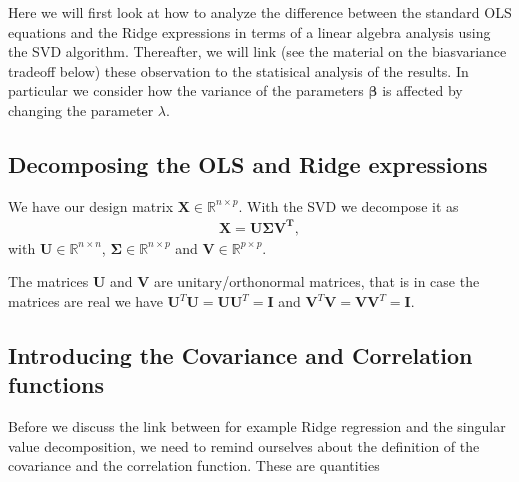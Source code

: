 \documentclass[letterpaper,10pt,english]{sphinxmanual}
\begin{document}
Here we will first look at how to analyze the difference between the
standard OLS equations and the Ridge expressions in terms of a linear
algebra analysis using the SVD algorithm. Thereafter, we will link
(see the material on the bias\sphinxhyphen{}variance tradeoff below) these
observation to the statisical analysis of the results. In particular
we consider how the variance of the parameters \(\boldsymbol{\beta}\) is
affected by changing the parameter \(\lambda\).


\subsection{Decomposing the OLS and Ridge expressions}
\label{\detokenize{chapter4:decomposing-the-ols-and-ridge-expressions}}
We have our design matrix
\(\boldsymbol{X}\in {\mathbb{R}}^{n\times p}\). With the SVD we decompose it as
\begin{equation*}
\begin{split}
\boldsymbol{X} = \boldsymbol{U\Sigma V^T},
\end{split}
\end{equation*}
with \(\boldsymbol{U}\in {\mathbb{R}}^{n\times n}\), \(\boldsymbol{\Sigma}\in {\mathbb{R}}^{n\times p}\)
and \(\boldsymbol{V}\in {\mathbb{R}}^{p\times p}\).

The matrices \(\boldsymbol{U}\) and \(\boldsymbol{V}\) are unitary/orthonormal matrices, that is in case the matrices are real we have \(\boldsymbol{U}^T\boldsymbol{U}=\boldsymbol{U}\boldsymbol{U}^T=\boldsymbol{I}\) and \(\boldsymbol{V}^T\boldsymbol{V}=\boldsymbol{V}\boldsymbol{V}^T=\boldsymbol{I}\).


\subsection{Introducing the Covariance and Correlation functions}
\label{\detokenize{chapter4:introducing-the-covariance-and-correlation-functions}}
Before we discuss the link between for example Ridge regression and the singular value decomposition, we need to remind ourselves about
the definition of the covariance and the correlation function. These are quantities
\end{document}
